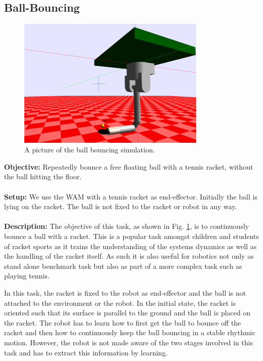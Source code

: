 \documentclass[11pt, article, colorback]{article}
\begin{document}
\subsection{Ball-Bouncing}
\begin{figure}
\centering
 \includegraphics[width=0.8\textwidth]{Pics/Bouncing.png}
  \caption{A picture of the ball bouncing simulation.}
  \label{pic:ballBouncing}
\end{figure}
%
\textbf{Objective:} Repeatedly bounce a free floating ball with a tennis racket, without the ball hitting the floor. \\ \\
%
\textbf{Setup:}  We use the WAM with a tennis racket as end-effector. Initially the ball is lying on the racket. The 
ball is not fixed to the racket or robot in any way. \\ \\
%
\textbf{Description:}
The objective of this task, as shown in Fig. \ref{pic:ballBouncing}, is to continuously bounce a ball with a racket. 
This is a popular task amongst children and students of racket sports as it trains the understanding of the 
systems dynamics as well as the handling of the racket itself. As such it is also useful for robotics not only 
as stand alone benchmark task but also as part of a more complex task such as playing tennis. 

In this task, the racket is fixed to the robot as end-effector and the ball is not attached to the environment or the robot. 
In the initial state, the racket is oriented such that its surface is parallel to the ground and the ball is placed 
on the racket. The robot has to learn how to first get the ball to bounce off the racket and then how 
to continuously keep the ball bouncing in a stable rhythmic motion. However, the robot is not made aware 
of the two stages involved in this task and has to extract this information by learning. 
\end{document}
